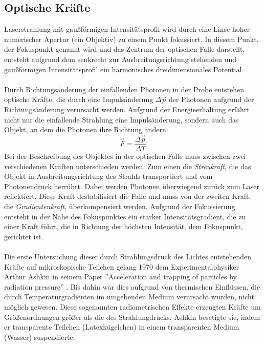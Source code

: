 \documentclass[a4paper,titlepage]{scrartcl}
\numberwithin{equation}{section}
\begin{document}
\subsection{Optische Kräfte}
Laserstrahlung mit gaußförmigen Intensitätsprofil wird durch eine Linse hoher numerischer Apertur (ein Objektiv) zu einem Punkt fokussiert. In diesem Punkt, der Fokuspunkt genannt wird und das Zentrum der optischen Falle darstellt, entsteht aufgrund dem senkrecht zur Ausbreitungsrichtung stehenden und gaußförmigen Intensitätsprofil ein harmonisches dreidimensionales Potential.\\ \\
Durch Richtungsänderung der einfallenden Photonen in der Probe entstehen optische Kräfte, die durch eine Impulsänderung $\Delta \vec{p}$ der Photonen aufgrund der Richtungsänderung verursacht werden. Aufgrund der Energieerhaltung erfährt nicht nur die einfallende Strahlung eine Impulsänderung, sondern auch das Objekt, an dem die Photonen ihre Richtung ändern:
\begin{equation*}
\vec{F}=\frac{\Delta \vec{p}}{\Delta T}
\end{equation*}
Bei der Beschreibung des Objektes in der optischen Falle muss zwischen zwei verschiedenen Kräften unterschieden werden. Zum einen die \emph{Streukraft}, die das Objekt in Ausbreitungsrichtung des Strahls transportiert und vom Photonendruck herrührt. Dabei werden Photonen überwiegend zurück zum Laser reflektiert. Diese Kraft destabilisiert die Falle und muss von der zweiten Kraft, die \emph{Gradientenkraft}, überkompensiert werden. Aufgrund der Fokussierung entsteht in der Nähe des Fokuspunktes ein starker Intensitätsgradient, die zu einer Kraft führt, die in Richtung der höchsten Intensität, dem Fokuspunkt, gerichtet ist.\\ \\
Die erste Untersuchung dieser durch Strahlungsdruck des Lichtes entstehenden Kräfte auf mikroskopische Teilchen gelang 1970 dem Experimentalphysiker Arthur Ashkin in seinem Paper ''Acceleration and trapping of particles by radiation pressure'' \cite{ashkin1970}. Bis dahin war dies aufgrund von thermischen Einflüssen, die durch Temperaturgradienten im umgebenden Medium verursacht wurden, nicht möglich gewesen. Diese sogenannten radiometrischen Effekte erzeugten Kräfte um Größenordnungen größer als die des Strahlungdrucks. Ashkin besetigte sie, indem er transparente Teilchen (Latexkügelchen) in einem transparenten Medium (Wasser) suspendierte.\\ \\
\end{document}
